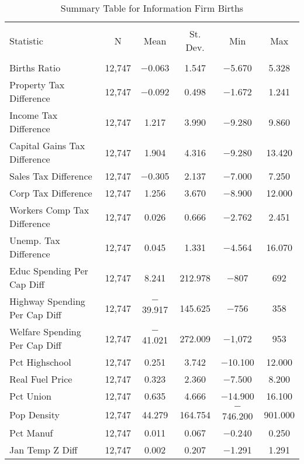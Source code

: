 
\begin{table}[!htbp] \centering 
  \caption{Summary Table for  Information Firm Births} 
  \label{51summary} 
\begin{tabular}{@{\extracolsep{5pt}}lccccc} 
\\[-1.8ex]\hline 
\hline \\[-1.8ex] 
Statistic & \multicolumn{1}{c}{N} & \multicolumn{1}{c}{Mean} & \multicolumn{1}{c}{St. Dev.} & \multicolumn{1}{c}{Min} & \multicolumn{1}{c}{Max} \\ 
\hline \\[-1.8ex] 
Births Ratio & 12,747 & $-$0.063 & 1.547 & $-$5.670 & 5.328 \\ 
Property Tax Difference & 12,747 & $-$0.092 & 0.498 & $-$1.672 & 1.241 \\ 
Income Tax Difference & 12,747 & 1.217 & 3.990 & $-$9.280 & 9.860 \\ 
Capital Gains Tax Difference & 12,747 & 1.904 & 4.316 & $-$9.280 & 13.420 \\ 
Sales Tax Difference & 12,747 & $-$0.305 & 2.137 & $-$7.000 & 7.250 \\ 
Corp Tax Difference & 12,747 & 1.256 & 3.670 & $-$8.900 & 12.000 \\ 
Workers Comp Tax Difference & 12,747 & 0.026 & 0.666 & $-$2.762 & 2.451 \\ 
Unemp. Tax Difference & 12,747 & 0.045 & 1.331 & $-$4.564 & 16.070 \\ 
Educ Spending Per Cap Diff & 12,747 & 8.241 & 212.978 & $-$807 & 692 \\ 
Highway Spending Per Cap Diff & 12,747 & $-$39.917 & 145.625 & $-$756 & 358 \\ 
Welfare Spending Per Cap Diff & 12,747 & $-$41.021 & 272.009 & $-$1,072 & 953 \\ 
Pct Highschool & 12,747 & 0.251 & 3.742 & $-$10.100 & 12.000 \\ 
Real Fuel Price & 12,747 & 0.323 & 2.360 & $-$7.500 & 8.200 \\ 
Pct Union & 12,747 & 0.635 & 4.666 & $-$14.900 & 16.100 \\ 
Pop Density & 12,747 & 44.279 & 164.754 & $-$746.200 & 901.000 \\ 
Pct Manuf & 12,747 & 0.011 & 0.067 & $-$0.240 & 0.250 \\ 
Jan Temp Z Diff & 12,747 & 0.002 & 0.207 & $-$1.291 & 1.291 \\ 

\end{tabular}
\end{table}
